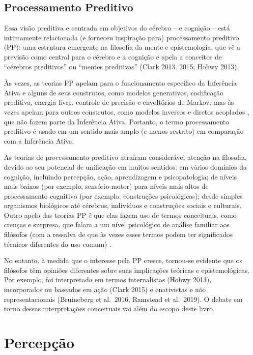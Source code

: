 \documentclass[
  12pt,
]{book}
\begin{document}
\hypertarget{processamento-preditivo}{%
\subsection{Processamento Preditivo}\label{processamento-preditivo}}

Essa visão preditiva e centrada em objetivos do cérebro -- e cognição -- está intimamente relacionada (e forneceu inspiração para) processamento preditivo (PP): uma estrutura emergente na filosofia da mente e epistemologia, que vê a previsão como central para o cérebro e a cognição e apela a conceitos de ``cérebros preditivos'' ou ``mentes preditivas'' (Clark 2013, 2015; Hohwy 2013).

Às vezes, as teorias PP apelam para o funcionamento específico da Inferência Ativa e alguns de seus construtos, como modelos generativos, codificação preditiva, energia livre, controle de precisão e envoltórios de Markov, mas às vezes apelam para outros construtos, como modelos inversos e diretos acoplados , que não fazem parte da Inferência Ativa. Portanto, o termo processamento preditivo é usado em um sentido mais amplo (e menos restrito) em comparação com a Inferência Ativa.

As teorias de processamento preditivo atraíram considerável atenção na filosofia, devido ao seu potencial de unificação em muitos sentidos: em vários domínios da cognição, incluindo percepção, ação, aprendizagem e psicopatologia; de níveis mais baixos (por exemplo, sensório-motor) para níveis mais altos de processamento cognitivo (por exemplo, construções psicológicas); desde simples organismos biológicos até cérebros, indivíduos e construções sociais e culturais. Outro apelo das teorias PP é que elas fazem uso de termos conceituais, como crenças e surpresa, que falam a um nível psicológico de análise familiar aos filósofos (com a ressalva de que às vezes esses termos podem ter significados técnicos diferentes do uso comum) .

No entanto, à medida que o interesse pela PP cresce, tornou-se evidente que os filósofos têm opiniões diferentes sobre suas implicações teóricas e epistemológicas. Por exemplo, foi interpretado em termos internalistas (Hohwy 2013), incorporados ou baseados em ação (Clark 2015) e enativistas e não representacionais (Bruineberg et al.~2016, Ramstead et al.~2019). O debate em torno dessas interpretações conceituais vai além do escopo deste livro.

\hypertarget{percepuxe7uxe3o}{%
\section{Percepção}\label{percepuxe7uxe3o}}
\end{document}
